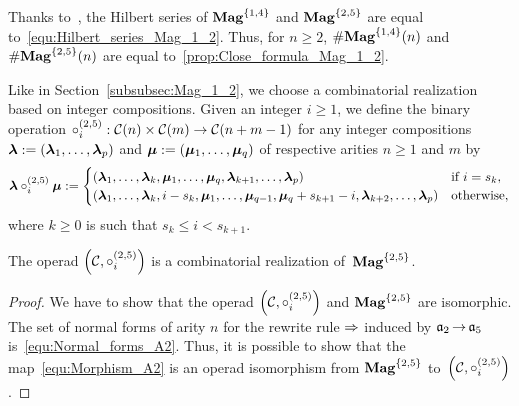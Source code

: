 Thanks to~\cite{Gir18}, the Hilbert series of $\mathbf{Mag}^{\{1, 4\}}$ and
$\mathbf{Mag}^{\{2, 5\}}$ are equal to~\eqref{equ:Hilbert_series_Mag_1_2}. Thus,
for $n \geq 2$,
$\# \mathbf{Mag}^{\{1, 4\}}(n)$ and $\# \mathbf{Mag}^{\{2, 5\}}(n)$ are
equal to~\eqref{prop:Close_formula_Mag_1_2}.
\medbreak

Like in Section~\ref{subsubsec:Mag_1_2}, we choose a combinatorial
realization based on integer compositions.
Given an integer $i \geq 1$, we define the binary operation
\begin{math}
    \circ_i^{(2,5)} : \mathcal{C}(n) \times \mathcal{C}(m)
    \to\mathcal{C}(n + m - 1)
\end{math}
for any integer compositions
$\bm{\lambda} := \left(\bm{\lambda}_1, \dots, \bm{\lambda}_p\right)$ and
$\bm{\mu} := \left(\bm{\mu}_1, \dots, \bm{\mu}_q\right)$ of respective arities
$n \geq 1$ and $m$ by
\begin{equation}
    \bm{\lambda} \circ_i^{(2,5)} \bm{\mu} :=
    \begin{cases}
        \left(\bm{\lambda}_1, \dots, \bm{\lambda}_k,
        \bm{\mu}_1, \dots, \bm{\mu}_q,
        \bm{\lambda}_{k + 1}, \dots, \bm{\lambda}_p\right)
            & \mbox{if } i = s_k, \\
        \left(\bm{\lambda}_1, \dots, \bm{\lambda}_k,
        i - s_k, \bm{\mu}_1, \dots, \bm{\mu}_{q - 1},
        \bm{\mu}_q + s_{k + 1} - i, \bm{\lambda}_{k + 2}, \dots, \bm{\lambda}_p
        \right)
            & \mbox{otherwise},
    \end{cases}
\end{equation}
where $k \geq 0$ is such that
\begin{math}
    s_k \leq i < s_{k + 1}.
\end{math}
\medbreak

\begin{Proposition} \label{prop:Realisation_Mag_1_4}
    The operad $\left(\mathcal{C}, \circ_i^{(2,5)}\right)$ is a
    combinatorial realization of~$\mathbf{Mag}^{\{2, 5\}}$.
\end{Proposition}
\begin{proof}
    We have to show that the operad
    $\left(\mathcal{C}, \circ_i^{(2,5)}\right)$ and $\mathbf{Mag}^{\{2, 5\}}$
    are isomorphic. The set of normal forms of arity $n$ for the
    rewrite rule $\operatorname{\Rightarrow}$ induced by $\mathfrak{a}_2 \operatorname{\to} \mathfrak{a}_5$
    is~\eqref{equ:Normal_forms_A2}. Thus, it is possible to show that
    the map~\eqref{equ:Morphism_A2} is an operad isomorphism from
    $\mathbf{Mag}^{\{2, 5\}}$ to~$\left(\mathcal{C}, \circ_i^{(2,5)}\right)$.
\end{proof}
\medbreak

